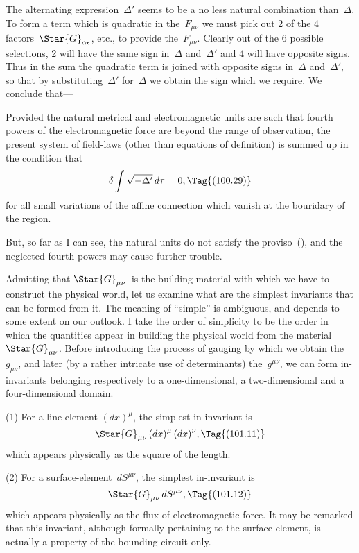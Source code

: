 \documentclass[12pt]{book}
\begin{document}
The alternating expression~$\Delta'$ seems to be a no less natural combination than~$\Delta$.
To form a term which is quadratic in the~$F_{\mu\nu}$ we must pick out 2 of the 4
factors~$\Star{G}_{\alpha\epsilon}$, etc., to provide the~$F_{\mu\nu}$.
Clearly out of the 6 possible selections, 2 will have the same sign in~$\Delta$ and~$\Delta'$ and 4 will have
opposite signs.
Thus in the sum the quadratic term is joined with opposite signs in~$\Delta$ and~$\Delta'$, so that by
substituting~$\Delta'$ for~$\Delta$ we obtain the sign which we require.
We conclude that---

Provided the natural metrical and electromagnetic units are such that fourth powers of the electromagnetic force
are beyond the range of observation, the present system of field-laws (other than equations of definition) is
summed up in the condition that
\[
\delta \int \sqrt{-\Delta'}\,d\tau = 0,
\Tag{(100.29)}
\]
for all small variations of the affine connection which vanish at the bouridary of the region.

But, so far as I can see, the natural units do not satisfy the proviso~(), and the neglected fourth
powers may cause further trouble.

%
%

Admitting that $\Star{G}_{\mu\nu}$~is the building-material with which we have to construct
the physical world, let us examine what are the simplest invariants
that can be formed from it. The meaning of ``simple'' is ambiguous, and
depends to some extent on our outlook. I take the order of simplicity to be
the order in which the quantities appear in building the physical world from
the material~$\Star{G}_{\mu\nu}$. Before introducing the process of gauging by which we
obtain the~$g_{\mu\nu}$, and later (by a rather intricate use of determinants) the~$g^{\mu\nu}$,
we can form in-invariants belonging respectively to a one-dimensional, a two-dimensional
%
and a four-dimensional domain.

(1) For a line-element $(dx)^{\mu}$, the simplest in\hyp{}invariant is
\[
\Star{G}_{\mu\nu}\, (dx)^{\mu}\, (dx)^{\nu},
\Tag{(101.11)}
\]
which appears physically as the square of the length.

(2) For a surface\hyp{}element~$dS^{\mu\nu}$, the simplest in-invariant is
%
\[
\Star{G}_{\mu\nu}\, dS^{\mu\nu},
\Tag{(101.12)}
\]
which appears physically as the flux of electromagnetic force. It may be
%
remarked that this invariant, although formally pertaining to the surface-element,
is actually a property of the bounding circuit only.
\end{document}
